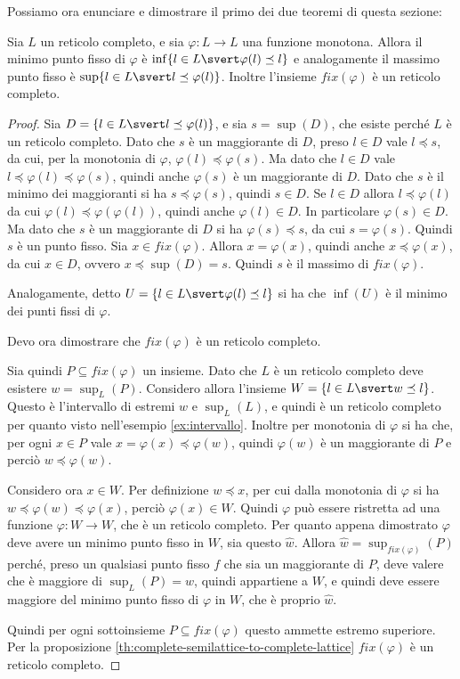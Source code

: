 \documentclass[12pt]{article}
\numberwithin{theorem}{subsection}
\begin{document}
Possiamo ora enunciare e dimostrare il primo dei due teoremi di questa sezione:
\begin{theorem}[Tarski]
	Sia $L$ un reticolo completo, e sia $\varphi : L \rightarrow L$ una funzione monotona. Allora il minimo punto fisso di $\varphi$ è $\inf \{ l \in L \svert \varphi(l) \preceq l \}$ e analogamente il massimo punto fisso è $\sup \{ l \in L \svert l \preceq \varphi(l) \}$.
	Inoltre l'insieme $fix(\varphi)$ è un reticolo completo.
\end{theorem}
\begin{proof}
	Sia $D = \{ l \in L \svert l \preceq \varphi(l) \}$, e sia $s = \sup(D)$, che esiste perché $L$ è un reticolo completo.
	Dato che $s$ è un maggiorante di $D$, preso $l \in D$ vale $l \preceq s$, da cui, per la monotonia di $\varphi$, $\varphi(l) \preceq \varphi(s)$. Ma dato che $l \in D$ vale $l \preceq \varphi(l) \preceq \varphi(s)$, quindi anche $\varphi(s)$ è un maggiorante di $D$. Dato che $s$ è il minimo dei maggioranti si ha $s \preceq \varphi(s)$, quindi $s \in D$.
	Se $l \in D$ allora $l \preceq \varphi(l)$ da cui $\varphi(l) \preceq \varphi(\varphi(l))$, quindi anche $\varphi(l) \in D$. In particolare $\varphi(s) \in D$. Ma dato che $s$ è un maggiorante di $D$ si ha $\varphi(s) \preceq s$, da cui $s = \varphi(s)$. Quindi $s$ è un punto fisso.
	Sia $x \in fix(\varphi)$. Allora $x = \varphi(x)$, quindi anche $x \preceq \varphi(x)$, da cui $x \in D$, ovvero $x \preceq \sup(D) = s$. Quindi $s$ è il massimo di $fix(\varphi)$.
	
	Analogamente, detto $U = \{ l \in L \svert \varphi(l) \preceq l \}$ si ha che $\inf(U)$ è il minimo dei punti fissi di $\varphi$.
	
	Devo ora dimostrare che $fix(\varphi)$ è un reticolo completo.
	
	Sia quindi $P \subseteq fix(\varphi)$ un insieme. Dato che $L$ è un reticolo completo deve esistere $w = \sup_L(P)$. Considero allora l'insieme $W = \{ l \in L \svert w \preceq l \}$. Questo è l'intervallo di estremi $w$ e $\sup_L(L)$, e quindi è un reticolo completo per quanto visto nell'esempio \ref{ex:intervallo}.
	Inoltre per monotonia di $\varphi$ si ha che, per ogni $x \in P$ vale $x = \varphi(x) \preceq \varphi(w)$, quindi $\varphi(w)$ è un maggiorante di $P$ e perciò $w \preceq \varphi(w)$.
	
	Considero ora $x \in W$. Per definizione $w \preceq x$, per cui dalla monotonia di $\varphi$ si ha $w \preceq \varphi(w) \preceq \varphi(x)$, perciò $\varphi(x) \in W$. Quindi $\varphi$ può essere ristretta ad una funzione $\varphi : W \rightarrow W$, che è un reticolo completo.
	Per quanto appena dimostrato $\varphi$ deve avere un minimo punto fisso in $W$, sia questo $\hat{w}$. Allora $\hat{w} = \sup_{fix(\varphi)}(P)$ perché, preso un qualsiasi punto fisso $f$ che sia un maggiorante di $P$, deve valere che è maggiore di $\sup_L(P) = w$, quindi appartiene a $W$, e quindi deve essere maggiore del minimo punto fisso di $\varphi$ in $W$, che è proprio $\hat{w}$.
	
	Quindi per ogni sottoinsieme $P \subseteq fix(\varphi)$ questo ammette estremo superiore. Per la proposizione \ref{th:complete-semilattice-to-complete-lattice} $fix(\varphi)$ è un reticolo completo.
\end{proof} 
\end{document}

